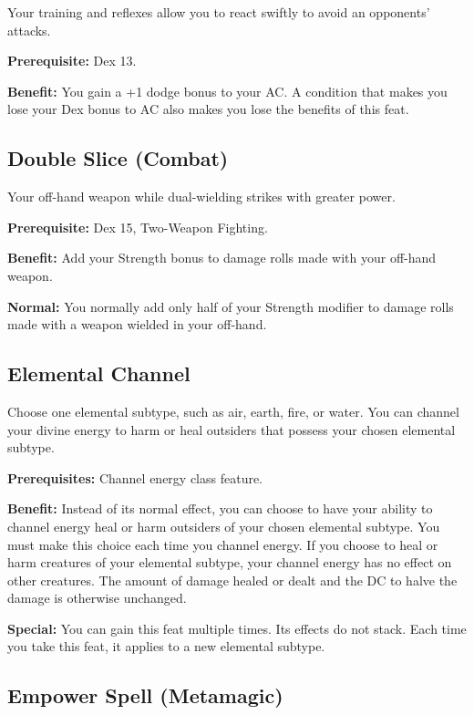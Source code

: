 				
Your training and reflexes allow you to react swiftly to avoid an opponents' attacks.
				
\textbf{Prerequisite:} Dex 13.
				
\textbf{Benefit:} You gain a +1 dodge bonus to your AC. A condition that makes you lose your Dex bonus to AC also makes you lose the benefits of this feat.
				
\subsection{Double Slice (Combat)}

				
Your off-hand weapon while dual-wielding strikes with greater power.
				
\textbf{Prerequisite:} Dex 15, Two-Weapon Fighting.
				
\textbf{Benefit:} Add your Strength bonus to damage rolls made with your off-hand weapon.
				
\textbf{Normal:} You normally add only half of your Strength modifier to damage rolls made with a weapon wielded in your off-hand.
				
\subsection{Elemental Channel}

				
Choose one elemental subtype, such as air, earth, fire, or water. You can channel your divine energy to harm or heal outsiders that possess your chosen elemental subtype.
				
\textbf{Prerequisites:} Channel energy class feature.
				
\textbf{Benefit:} Instead of its normal effect, you can choose to have your ability to channel energy heal or harm outsiders of your chosen elemental subtype. You must make this choice each time you channel energy. If you choose to heal or harm creatures of your elemental subtype, your channel energy has no effect on other creatures. The amount of damage healed or dealt and the DC to halve the damage is otherwise unchanged.
				
\textbf{Special:} You can gain this feat multiple times. Its effects do not stack. Each time you take this feat, it applies to a new elemental subtype.
				
\subsection{Empower Spell (Metamagic)}

